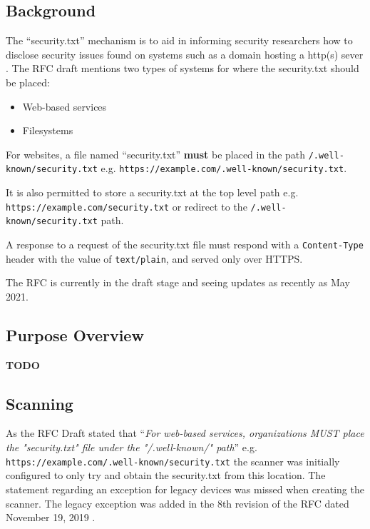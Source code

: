 \documentclass{mscreport}
\begin{document}
\subsection{Background}
The ``security.txt'' mechanism is to aid in informing security researchers how to disclose security issues found on systems such as a domain hosting a http(s) sever \cite{Foudil2021-vh}. The RFC draft mentions two types of systems for where the security.txt should be placed:

\begin{itemize}
  \item Web-based services
  \item Filesystems
\end{itemize}

\vspace{0.3cm} \noindent
For websites, a file named ``security.txt'' \textbf{must} be placed in the path \texttt{/.well-known/security.txt} e.g. \texttt{https://example.com/.well-known/security.txt}.

\vspace{0.3cm} \noindent
It is also permitted to store a security.txt at the top level path e.g. \texttt{https://example.com/security.txt} or redirect to the \texttt{/.well-known/security.txt} path.

\vspace{0.3cm} \noindent
A response to a request of the security.txt file must respond with a \texttt{Content-Type} header with the value of \texttt{text/plain}, and served only over HTTPS.

\vspace{0.3cm} \noindent
The RFC is currently in the draft stage and seeing updates as recently as May 2021.

\subsection{Purpose Overview}

\textbf{TODO}

\subsection{Scanning}

\vspace{0.3cm} \noindent
As the RFC Draft stated that ``\textit{For web-based services, organizations MUST place the "security.txt" file under the "/.well-known/" path}'' \cite{Foudil2021-vh} e.g. \newline \texttt{https://example.com/.well-known/security.txt} the scanner was initially configured to only try and obtain the security.txt from this location. The statement regarding an exception for legacy devices was missed when creating the scanner. The legacy exception was added in the 8th revision of the RFC dated November 19, 2019 \cite{Foudil2021-vh}.
\end{document}
